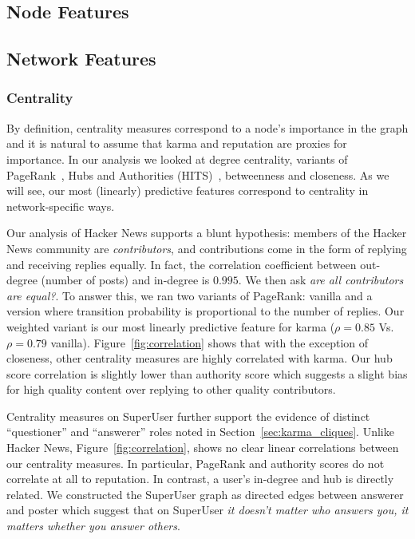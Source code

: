\documentclass[11pt]{article}
\begin{document}
\subsection{Node Features}

\subsection{Network Features}

\subsubsection{Centrality}
\label{sec:centrality}
By definition, centrality measures correspond to a node's importance in the
graph and it is natural to assume that karma and reputation are proxies for
importance. In our analysis we looked at degree centrality, variants of
PageRank~\cite{page1999pagerank}, Hubs and
Authorities (HITS)~\cite{kleinberg1999authoritative}, betweenness and 
closeness. As we will see, our most (linearly) predictive features 
correspond to centrality in network-specific ways. 

Our analysis of Hacker News supports a blunt hypothesis: members of the Hacker
News community are \textit{contributors}, and contributions come in the form of
replying and receiving replies equally. In fact, the correlation coefficient 
between out-degree (number of posts) and in-degree is $0.995$. We then ask
\textit{are all contributors are equal?}. To answer this, we ran two variants of PageRank: 
vanilla and a version where transition probability is proportional 
to the number of replies. Our weighted variant is our most linearly predictive
feature for karma ($\rho = 0.85$ Vs. $\rho=0.79$ vanilla).
Figure~\ref{fig:correlation} shows that with the exception
of closeness, other centrality measures are highly correlated with karma.
Our hub score correlation is slightly lower than authority score which suggests
a slight bias for high quality content over replying to other quality
contributors.

Centrality measures on SuperUser further support the evidence of distinct
``questioner'' and ``answerer'' roles noted in Section~\ref{sec:karma_cliques}.
Unlike Hacker News, Figure~\ref{fig:correlation}, shows no clear linear
correlations between our centrality measures. In particular, PageRank and
authority scores do not correlate at all to reputation. In contrast, a user's
in-degree and hub is directly related. We constructed the SuperUser graph as
directed edges between answerer and poster which suggest that on SuperUser
\textit{it doesn't matter who answers you, it matters whether you answer others}.
\end{document}
